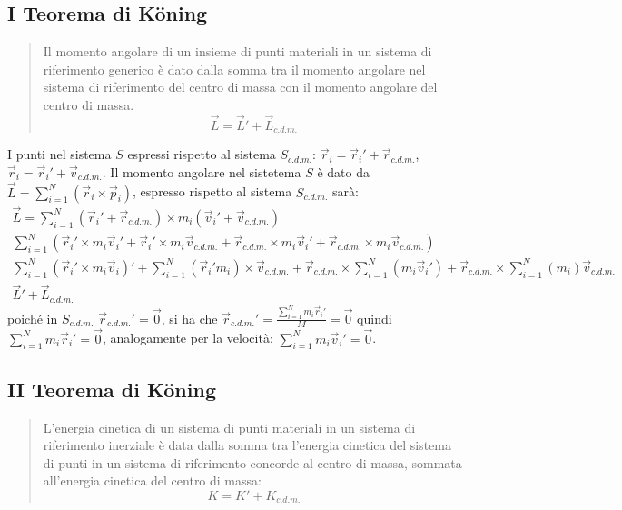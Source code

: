 \documentclass{article}
\numberwithin{equation}{subsection}
\begin{document}
\subsection{I Teorema di K\"oning}
\begin{quotation}
    Il momento angolare di un insieme di punti materiali in un 
    sistema di riferimento generico è dato dalla somma tra 
    il momento angolare nel sistema di riferimento del centro 
    di massa con il momento angolare del centro di massa.
    \begin{equation}
        \vec{L}=\vec{L}'+\vec{L}_{c.d.m.}
    \end{equation}
\end{quotation}
I punti nel sistema $S$ espressi rispetto al sistema $S_{c.d.m.}$: $\vec{r}_i=\vec{r}_i'+\vec{r}_{c.d.m.}$, 
$\vec{r}_i=\vec{r}_i'+\vec{v}_{c.d.m.}$.
Il momento angolare nel sistetema $S$ è dato da $\vec{L}=\displaystyle\sum_{i=1}^{N}(\vec{r}_i\times\vec{p}_i)$, 
espresso rispetto al sistema $S_{c.d.m.}$ sarà: 
\begin{gather*}
    \vec{L}=\displaystyle\sum_{i=1}^{N}(\vec{r}_i'+\vec{r}_{c.d.m.})\times m_i(\vec{v}_i'+\vec{v}_{c.d.m.})\\
    \displaystyle\sum_{i=1}^{N}\left(\vec{r}_i'\times m_i\vec{v}_i'+\vec{r}_i'\times m_i\vec{v}_{c.d.m.}+\vec{r}_{c.d.m.}\times m_i\vec{v}_i'+\vec{r}_{c.d.m.}\times m_i\vec{v}_{c.d.m.}\right)\\
    \displaystyle\sum_{i=1}^{N}(\vec{r}_i'\times m_i\vec{v}_i)'+\sum_{i=1}^{N}(\vec{r}_i'm_i)\times \vec{v}_{c.d.m.}+\vec{r}_{c.d.m.}\times\sum_{i=1}^{N}(m_i\vec{v}_i')+\vec{r}_{c.d.m.}\times\sum_{i=1}^{N}(m_i )\vec{v}_{c.d.m.}\\
    \vec{L}'+\vec{L}_{c.d.m.}
\end{gather*}
poiché in $S_{c.d.m.}$ $\vec{r}_{c.d.m.}'=\vec{0}$, 
si ha che $\vec{r}_{c.d.m.}'=\displaystyle\frac{\sum_{i=1}^{N}m_i\vec{r}_i'}{M}=\vec{0}$ 
quindi $\sum_{i=1}^{N}m_i\vec{r}_i'=\vec{0}$, analogamente 
per la velocità: $\sum_{i=1}^{N}m_i\vec{v}_i'=\vec{0}$. 

\subsection{II Teorema di K\"{o}ning}
\begin{quotation}
    L'energia cinetica di un sistema di punti materiali in un 
    sistema di riferimento inerziale è data dalla somma tra 
    l'energia cinetica del sistema di punti in un sistema di 
    riferimento concorde al centro di massa, sommata all'energia 
    cinetica del centro di massa:
    \begin{equation}
        K=K'+K_{c.d.m.}
    \end{equation}
\end{quotation}
\end{document}
